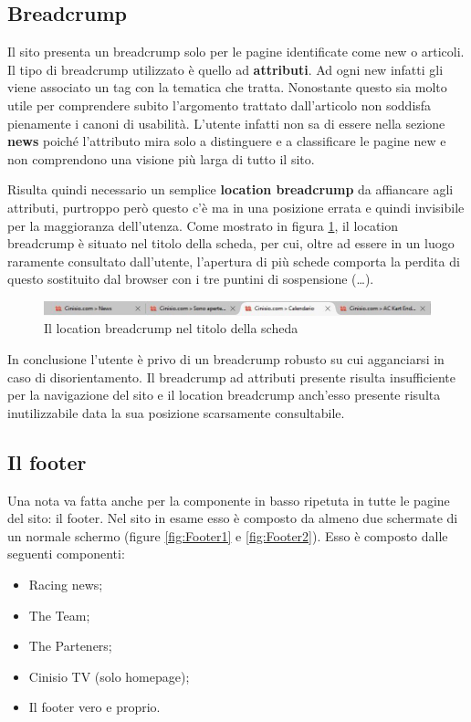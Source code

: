 	
	\newpage
	\subsection{Breadcrump}
		Il sito presenta un breadcrump solo per le pagine identificate come new o articoli. Il tipo di breadcrump utilizzato è quello ad \textbf{attributi}. Ad ogni new infatti gli viene associato un tag con la tematica che tratta.
		Nonostante questo sia molto utile per comprendere subito l'argomento trattato dall'articolo non soddisfa pienamente i canoni di usabilità. L'utente infatti non sa di essere nella sezione \textbf{news} poiché l'attributo mira solo a distinguere e a classificare le pagine new e non comprendono una visione più larga di tutto il sito.
		
	Risulta quindi necessario un semplice \textbf{location breadcrump} da affiancare agli attributi, purtroppo però questo c'è ma in una posizione errata e quindi invisibile per la maggioranza dell'utenza. Come mostrato in figura \ref{fig:LocationBreadcrump}, il location breadcrump è situato nel titolo della scheda, per cui, oltre ad essere in un luogo raramente consultato dall'utente, l'apertura di più schede comporta la perdita di questo sostituito dal browser con i tre puntini di sospensione (\dots).
		
		\begin{figure} [h]
			\includegraphics[width=\textwidth]{images/Dettaglio_PathInTheTitleCard}
			\caption{Il location breadcrump nel titolo della scheda}
			\label{fig:LocationBreadcrump}
		\end{figure}
		
		 In conclusione l'utente è privo di un breadcrump robusto su cui agganciarsi in caso di disorientamento. Il breadcrump ad attributi presente risulta insufficiente per la navigazione del sito e il location breadcrump anch'esso presente risulta inutilizzabile data la sua posizione scarsamente consultabile.
		 
	\newpage
	\subsection{Il footer}
		Una nota va fatta anche per la componente in basso ripetuta in tutte le pagine del sito: il footer. Nel sito in esame esso è composto da almeno due schermate di un normale schermo (figure \ref{fig:Footer1} e \ref{fig:Footer2}). Esso è composto dalle seguenti componenti:
		\begin{itemize}
			\item Racing news;
			\item The Team;
			\item The Parteners;
			\item Cinisio TV (solo homepage);
			\item Il footer vero e proprio.
		\end{itemize}
		
